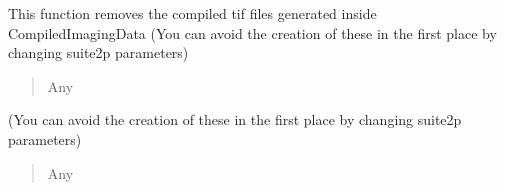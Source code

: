 \documentclass[letterpaper,10pt,english]{sphinxmanual}
\begin{document}
\begin{fulllineitems}
\begin{fulllineitems}
\end{fulllineitems}


\begin{fulllineitems}
\label{\detokenize{ExperimentHierarchy:ExperimentHierarchy.CollectedImagingAnalysisFolder.clean_up_compilation}}
\pysigstartsignatures
{}
\pysigstopsignatures
\sphinxAtStartPar
This function removes the compiled tif files generated inside CompiledImagingData
(You can avoid the creation of these in the first place by changing suite2p parameters)
\begin{quote}\begin{description}
\sphinxAtStartPar
Any

\end{description}\end{quote}

\end{fulllineitems}


\begin{fulllineitems}
\label{\detokenize{ExperimentHierarchy:ExperimentHierarchy.CollectedImagingAnalysisFolder.clean_up_motion_correction}}
\pysigstartsignatures
{}
\pysigstopsignatures\begin{description}
\sphinxAtStartPar
(You can avoid the creation of these in the first place by changing suite2p parameters)

\end{description}
\begin{quote}\begin{description}
\sphinxAtStartPar
Any

\end{description}\end{quote}


\end{fulllineitems}
\end{fulllineitems}
\end{document}
